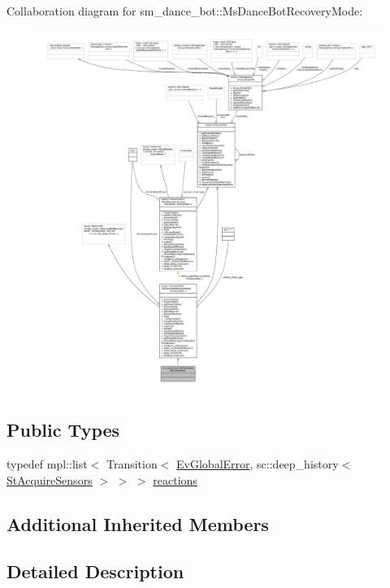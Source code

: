Collaboration diagram for sm\+\_\+dance\+\_\+bot\+:\+:Ms\+Dance\+Bot\+Recovery\+Mode\+:
\nopagebreak
\begin{figure}[H]
\begin{center}
\leavevmode
\includegraphics[width=350pt]{classsm__dance__bot_1_1MsDanceBotRecoveryMode__coll__graph}
\end{center}
\end{figure}
\subsection*{Public Types}
\begin{DoxyCompactItemize}
\item 
typedef mpl\+::list$<$ Transition$<$ \hyperlink{structsm__dance__bot_1_1EvGlobalError}{Ev\+Global\+Error}, sc\+::deep\+\_\+history$<$ \hyperlink{structsm__dance__bot_1_1StAcquireSensors}{St\+Acquire\+Sensors} $>$ $>$ $>$ \hyperlink{classsm__dance__bot_1_1MsDanceBotRecoveryMode_a666369214001b2d5628e4765f8a4ce6a}{reactions}
\end{DoxyCompactItemize}
\subsection*{Additional Inherited Members}


\subsection{Detailed Description}


